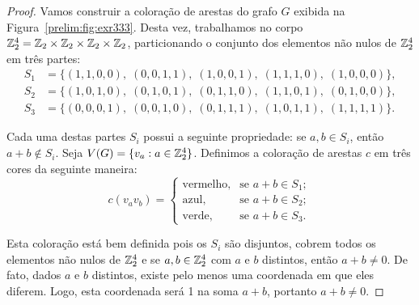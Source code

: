 \begin{proof}
Vamos construir a coloração de arestas do grafo $G$ exibida na Figura~\ref{prelim:fig:exr333}. Desta vez, trabalhamos no corpo $\mathbb{Z}_{2}^4 = \mathbb{Z}_{2}\times\mathbb{Z}_{2}\times\mathbb{Z}_{2}\times\mathbb{Z}_{2}$, particionando o conjunto dos elementos não nulos de $\mathbb{Z}_{2}^4$ em três partes:
\begin{align*}
S_1&=\big\{ (1,1,0,0),\;(0,0,1,1),\;(1,0,0,1),\;(1,1,1,0),\;(1,0,0,0) \big\},\\
S_2&=\big\{ (1,0,1,0),\;(0,1,0,1),\;(0,1,1,0),\;(1,1,0,1),\;(0,1,0,0) \big\},\\
S_3&=\big\{ (0,0,0,1),\;(0,0,1,0),\;(0,1,1,1),\;(1,0,1,1),\;(1,1,1,1) \big\}.
\end{align*}

Cada uma destas partes $S_i$ possui a seguinte propriedade: se $a,b \in S_i$, então $a + b \not\in S_i$. Seja $V(G) = \{v_a : a \in \mathbb{Z}_{2}^4\}$. Definimos a coloração de arestas $c$ em três cores da seguinte maneira:
\[c(v_a v_b) = \begin{cases}
  \text{vermelho}, & \text{se } a + b \in S_1; \\
  \text{azul}, & \text{se } a + b \in S_2; \\
  \text{verde}, & \text{se } a + b \in S_3.
\end{cases}\]

Esta coloração está bem definida pois os $S_i$ são disjuntos, cobrem todos os elementos não nulos de $\mathbb{Z}_{2}^4$ e se $a,b \in \mathbb{Z}_{2}^4$ com $a$ e $b$ distintos, então $a + b \neq 0$. De fato, dados $a$ e $b$ distintos, existe pelo menos uma coordenada em que eles diferem. Logo, esta coordenada será 1 na soma $a+b$, portanto $a + b \neq 0$.


\end{proof}
